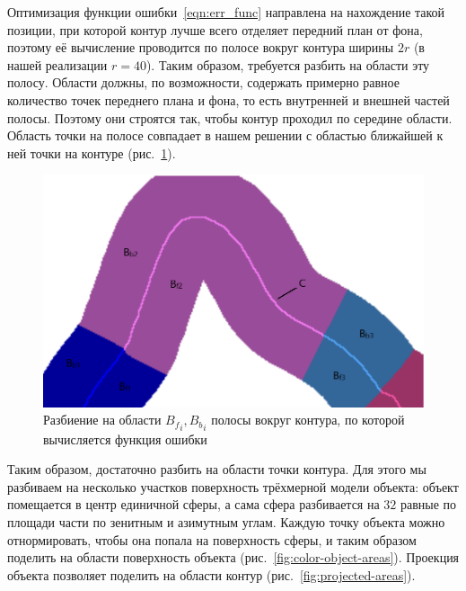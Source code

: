 Оптимизация функции ошибки~\ref{eqn:err_func} направлена на нахождение такой
позиции, при которой контур лучше всего отделяет передний план от фона, поэтому
её вычисление проводится по полосе вокруг контура ширины $2r$ (в нашей
реализации $r = 40$).
Таким образом, требуется разбить на области эту полосу.
Области должны, по возможности, содержать примерно равное количество точек
переднего плана и фона, то есть внутренней и внешней частей полосы.
Поэтому они строятся так, чтобы контур проходил по середине
области.
Область точки на полосе совпадает в нашем решении с областью ближайшей к ней
точки на контуре (рис.~\ref{fig:fb_contour}).

\begin{figure}[t]
\centering
\includegraphics[width=\textwidth]{fig/fb_contour.png}
\caption{
Разбиение на области ${B_f}_i, {B_b}_i$ полосы вокруг контура, по которой
вычисляется функция ошибки
} \label{fig:fb_contour}
\end{figure}

Таким образом, достаточно разбить на области точки контура.
Для этого мы разбиваем на несколько участков поверхность трёхмерной модели
объекта: объект помещается в центр единичной сферы, а сама сфера разбивается
на $32$ равные по площади части по зенитным и азимутным углам.
Каждую точку объекта можно отнормировать, чтобы она попала на поверхность
сферы, и таким образом поделить на области поверхность объекта
(рис.~\ref{fig:color-object-areas}).
Проекция объекта позволяет поделить на области контур
(рис.~\ref{fig:projected-areas}).

